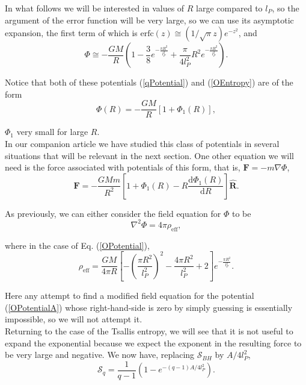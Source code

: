 \documentclass[nofootinbib,aps,prd,preprint,groupedaddress,showpacs,showkeys]{revtex4-1}
\newcommand{\dif}{\mathrm{d}}
\begin{document}
\noindent In what follows we will be interested in values of $R$ large compared to $l_P$, so the argument of the error function will be very large, so we can use its asymptotic expansion, the first term of which is $\mathrm{erfc}(z) \cong (1/\sqrt{\pi} z) e^{-z^2}$, and
\begin{equation}
\Phi \cong -\frac{GM}{R} \left( 1 - \frac{3}{8} e^{-\frac{\pi R^2}{l_P^2}} + \frac{\pi}{4 l_P^2} R^2 e^{-\frac{\pi R^2}{l_P^2}}\right). \label{OPotentialA}
\end{equation}

\noindent Notice that both of these potentials (\ref{qPotential}) and (\ref{OEntropy}) are of the form
\begin{equation}
\Phi (R) = -\frac{GM}{R} [1 + \Phi_1 (R)], \label{GenPot}
\end{equation}

\noindent $\Phi_1$ very small for large $R$.\\
\indent In our companion article we have studied this class of potentials in several situations that will be relevant in the next section. One other equation we will need is the force associated with potentials of this form, that is, $\mathbf{F} = -m \nabla \Phi$,
\begin{equation}
\mathbf{F} = -\frac{GMm}{R^2} \left[ 1 + \Phi_1 (R) - R \frac{\dif \Phi_1(R)}{\dif R} \right] \hat{\mathbf{R}}. \label{force}
\end{equation}

\indent As previously, we can either consider the field equation for $\Phi$ to be
\begin{equation}
\nabla^2 \Phi = 4 \pi \rho_{\mathrm{eff}},
\end{equation}

\noindent where in the case of Eq. (\ref{OPotential}),
\begin{equation}
\rho_{\mathrm{eff}} = \frac{GM}{4 \pi R} \left[ - \left( \frac{\pi R^2}{l_P^2} \right)^2 - \frac{4 \pi R^2}{l_P^2} + 2 \right] e^{-\frac{\pi R^2}{l_P^2}}.
\end{equation}

\noindent Here any attempt to find a modified field equation for the potential (\ref{OPotentialA}) whose right-hand-side is zero by simply guessing is essentially impossible, so we will not attempt it.\\
\indent Returning to the case of the Tsallis entropy, we will see that it is not useful to expand the exponential because we expect the exponent in the resulting force to be very large and negative. We now have, replacing $\mathcal{S}_{BH}$ by $A/4l_P^2$,
\begin{equation}
\mathcal{S}_q = \frac{1}{q - 1} (1 - e^{-(q-1) A/4 l_P^2}).
\end{equation}
\end{document}
